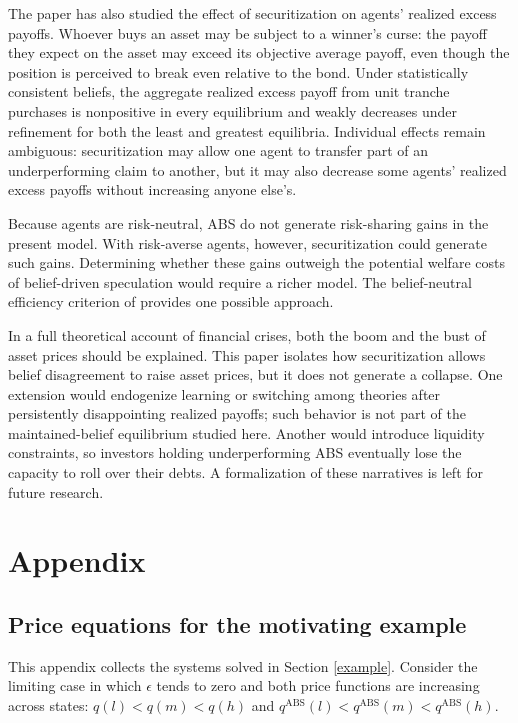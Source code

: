 \documentclass[11pt]{article}
\theoremstyle{plain}
\begin{document}
The paper has also studied the effect of securitization on agents' realized excess payoffs. Whoever buys an asset may be subject to a winner's curse: the payoff they expect on the asset may exceed its objective average payoff, even though the position is perceived to break even relative to the bond. Under statistically consistent beliefs, the aggregate realized excess payoff from unit tranche purchases is nonpositive in every equilibrium and weakly decreases under refinement for both the least and greatest equilibria. Individual effects remain ambiguous: securitization may allow one agent to transfer part of an underperforming claim to another, but it may also decrease some agents' realized excess payoffs without increasing anyone else's.

Because agents are risk-neutral, ABS do not generate risk-sharing gains in the present model. With risk-averse agents, however, securitization could generate such gains. Determining whether these gains outweigh the potential welfare costs of belief-driven speculation would require a richer model. The belief-neutral efficiency criterion of \cite{BrunnermeierSimsekXiong2014} provides one possible approach.

In a full theoretical account of financial crises, both the boom and the bust of asset prices should be explained. This paper isolates how securitization allows belief disagreement to raise asset prices, but it does not generate a collapse. One extension would endogenize learning or switching among theories after persistently disappointing realized payoffs; such behavior is not part of the maintained-belief equilibrium studied here. Another would introduce liquidity constraints, so investors holding underperforming ABS eventually lose the capacity to roll over their debts. A formalization of these narratives is left for future research.

\section{Appendix} \label{sec:appx}

\subsection{Price equations for the motivating example}\label{app:example-prices}

This appendix collects the systems solved in Section \ref{example}. Consider the limiting case in which $\epsilon$ tends to zero and both price functions are increasing across states: $q(l)<q(m)<q(h)$ and $q^{\mathrm{ABS}}(l)<q^{\mathrm{ABS}}(m)<q^{\mathrm{ABS}}(h)$.
\end{document}
